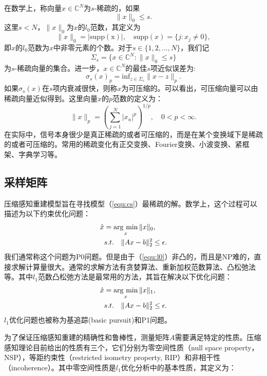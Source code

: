 在数学上，称向量$x\in \mathbb{C}^N$为$s$-稀疏的，如果
\begin{equation}
	\|x\|_0 \leq s.
\end{equation}
这里$s<N$，$\|x\|_0$为$x$的$l_0$范数，其定义为
$$\|x\|_0=|\mathrm{supp(x)}|,\quad \mathrm{supp}(x)=\{j: x_j\neq 0\},$$
即$x$的$l_0$范数为$x$中非零元素的个数。对于$s\in \{1,2,...,N\}$，我们记
$$\Sigma_s=\{x\in\mathbb{C}^N: \|x\|_0\leq s\}$$
为$s$-稀疏向量的集合。进一步，$x\in \mathbb{C}^N$的最佳$s$项近似误差为:
$$\sigma_s(x)_p=\mathrm{inf}_{z\in \Sigma_s}\|x-z\|_p.$$
如果$\sigma_s(x)$在$s$项内衰减很快，则称$x$为可压缩的。可以看出，可压缩向量可以由稀疏向量近似得到。这里向量$x$的$p$范数的定义为：
\begin{equation}
	\|x\|_p = (\sum_{j=1}^N|x_n|^p)^{1/p},\quad 0<p<\infty.
\end{equation}
在实际中，信号本身很少是真正稀疏的或者可压缩的，而是在某个变换域下是稀疏的或者可压缩的。常用的稀疏变化有正交变换、Fourier变换、小波变换、紧框架、字典学习等。

\subsection{采样矩阵}
压缩感知重建模型旨在寻找模型（\ref{equ:cs}）最稀疏的解。数学上，这个过程可以描述为以下约束优化问题：
\begin{equation}
\begin{aligned}
	\hat{x}&=\argmin_x \|x\|_0,\\
	&s.t.\quad \|Ax-b\|_2^2 \leq \epsilon.
\end{aligned}
\label{equ:l0}
\end{equation}
我们通常称这个问题为P0问题。但是由于（\ref{equ:l0}）非凸的，而且是NP难的，直接求解计算量很大。通常的求解方法有贪婪算法\cite{cosamp,tropp2006just}、重新加权范数算法\cite{gorodnitsky1997sparse,candes2008enhancing}、凸松弛法\cite{chen2001atomic}等。其中$l_1$范数凸松弛方法是最常用的方法，其旨在解决以下优化问题：
\begin{equation}
\begin{aligned}
	\hat{x}&=\argmin_x \|x\|_1,\\
	&s.t.\quad \|Ax-b\|_2^2 \leq \epsilon.
\end{aligned}
\label{equ:l1}
\end{equation}
$l_1$优化问题也被称为基追踪(basic pursuit\cite{bp})和P1问题。

为了保证压缩感知重建的精确性和鲁棒性，测量矩阵$A$需要满足特定的性质。压缩感知理论目前给出的性质有三个，它们分别为零空间性质（null space property，NSP），等距约束性（restricted isometry property, RIP）和非相干性（incoherence）。其中零空间性质是$l_1$优化分析中的基本性质，其定义为：

